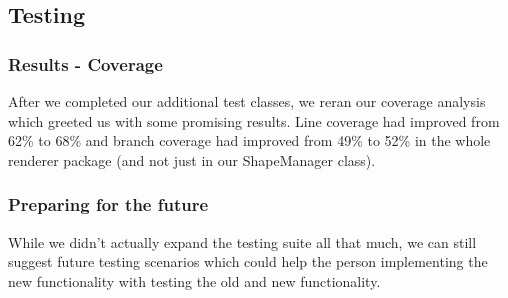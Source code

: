 \documentclass{article}
\begin{document}
\subsection{Testing}

\subsubsection{Results - Coverage}

After we completed our additional test classes, we reran our coverage analysis which greeted us with some promising results. Line coverage had improved from 62\% to 68\% and branch coverage had improved from 49\% to 52\% in the whole renderer package (and not just in our ShapeManager class).

\subsubsection{Preparing for the future}

While we didn't actually expand the testing suite all that much, we can still suggest future testing scenarios which could help the person implementing the new functionality with testing the old and new functionality.\\
\end{document}
